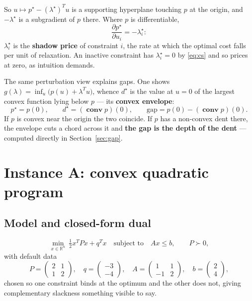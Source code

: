 \documentclass[11pt,a4paper]{article}
\theoremstyle{definition}
\newcommand{\R}{\mathbb{R}}
\newcommand{\pstar}{p^{\star}}
\newcommand{\dstar}{d^{\star}}
\newcommand{\lamstar}{\lambda^{\star}}
\newcommand{\conv}{\operatorname{\mathbf{conv}}}
\begin{document}
So $u\mapsto\pstar-(\lamstar)^{T}u$ is a supporting hyperplane touching $p$ at the origin, and
$-\lamstar$ is a subgradient of $p$ there. Where $p$ is differentiable,
\begin{equation}\label{eq:shadow}
\frac{\partial\pstar}{\partial u_{i}}=-\lambda_{i}^{\star}:
\end{equation}
$\lambda_{i}^{\star}$ is the \textbf{shadow price} of constraint $i$, the rate at which the
optimal cost falls per unit of relaxation. An inactive constraint has $\lambda_{i}^{\star}=0$ by
\eqref{eq:cs} and so prices at zero, as intuition demands.

The same perturbation view explains gaps. One shows
$g(\lambda)=\inf_{u}\bigl(p(u)+\lambda^{T}u\bigr)$, whence $\dstar$ is the value at $u=0$ of the
largest convex function lying below $p$ --- its \textbf{convex envelope}:
\begin{equation}\label{eq:gapgeom}
\pstar=p(0),\qquad \dstar=(\conv p)(0),\qquad \text{gap}=p(0)-(\conv p)(0).
\end{equation}
If $p$ is convex near the origin the two coincide. If $p$ has a non-convex dent there, the
envelope cuts a chord across it and \textbf{the gap is the depth of the dent} --- computed
directly in Section~\ref{sec:gap}.

\section{Instance A: convex quadratic program}\label{sec:qp}

\subsection{Model and closed-form dual}

\begin{equation}\label{eq:qp}
\min_{x\in\R^{n}}\ \tfrac{1}{2}x^{T}Px+q^{T}x\quad\text{subject to}\quad Ax\le b,
\qquad P\succ 0,
\end{equation}
with default data
\begin{equation}\label{eq:qpdata}
P=\begin{pmatrix}2&1\\1&2\end{pmatrix},\quad
q=\begin{pmatrix}-3\\-4\end{pmatrix},\quad
A=\begin{pmatrix}1&1\\-1&2\end{pmatrix},\quad
b=\begin{pmatrix}2\\4\end{pmatrix},
\end{equation}
chosen so one constraint binds at the optimum and the other does not, giving complementary
slackness something visible to say.
\end{document}

